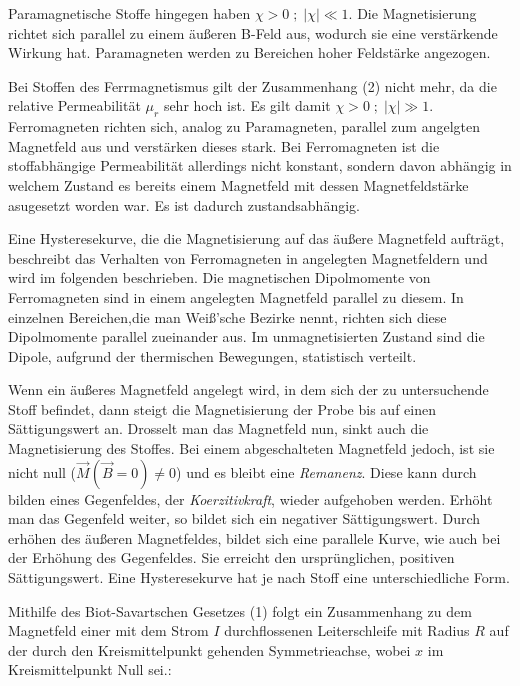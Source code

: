 Paramagnetische Stoffe hingegen haben $\chi > 0\; ; \;|\chi|\ll 1$. Die Magnetisierung richtet sich parallel zu einem äußeren B-Feld aus,
wodurch sie eine verstärkende Wirkung hat. Paramagneten werden zu Bereichen hoher Feldstärke angezogen.

Bei Stoffen des Ferrmagnetismus gilt der Zusammenhang (2) nicht mehr, da die relative Permeabilität $\mu_r$ sehr hoch ist. Es gilt damit
$\chi > 0\; ; \;|\chi|\gg 1$. Ferromagneten richten sich, analog zu Paramagneten, parallel zum angelgten Magnetfeld aus und verstärken dieses
stark. 
Bei Ferromagneten ist die stoffabhängige Permeabilität allerdings nicht konstant, sondern davon abhängig in welchem Zustand es bereits
einem Magnetfeld mit dessen Magnetfeldstärke asugesetzt worden war. Es ist dadurch zustandsabhängig.


Eine Hysteresekurve, die die Magnetisierung auf das äußere Magnetfeld aufträgt, beschreibt das Verhalten von Ferromagneten in
angelegten Magnetfeldern und wird im folgenden beschrieben. 
Die magnetischen Dipolmomente von Ferromagneten sind in einem angelegten
Magnetfeld parallel zu diesem. In einzelnen Bereichen,die man Weiß'sche Bezirke nennt, richten sich diese Dipolmomente parallel zueinander aus.
Im unmagnetisierten Zustand sind die Dipole, aufgrund der thermischen Bewegungen, statistisch verteilt.




Wenn ein äußeres Magnetfeld angelegt wird, in dem sich der zu untersuchende Stoff befindet, dann steigt die Magnetisierung der Probe bis
auf einen Sättigungswert an. Drosselt man das Magnetfeld nun, sinkt auch die Magnetisierung des Stoffes. Bei einem abgeschalteten Magnetfeld jedoch,
ist sie nicht null ($\vec M(\vec B = 0)\neq0$) und es bleibt eine \textit{Remanenz}.
Diese kann durch bilden eines Gegenfeldes, der \textit{Koerzitivkraft}, wieder aufgehoben werden. Erhöht man das Gegenfeld weiter, so bildet sich ein 
negativer Sättigungswert.
Durch erhöhen des äußeren Magnetfeldes, bildet sich eine parallele Kurve, wie auch bei der Erhöhung des Gegenfeldes. Sie erreicht den
ursprünglichen, positiven Sättigungswert. Eine Hysteresekurve hat je nach Stoff eine unterschiedliche Form.


Mithilfe des Biot-Savartschen Gesetzes (1) folgt ein Zusammenhang zu dem Magnetfeld einer mit dem Strom $I$ durchflossenen 
Leiterschleife mit Radius $R$ auf der durch den Kreismittelpunkt gehenden Symmetrieachse, wobei $x$ im Kreismittelpunkt Null sei.:

